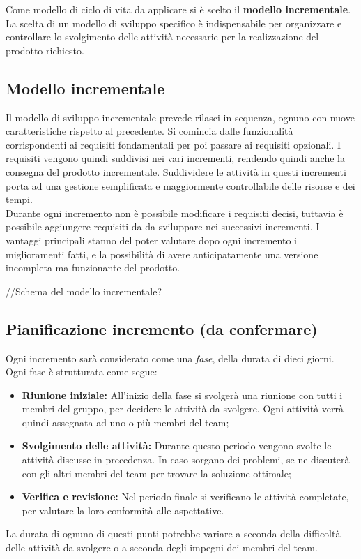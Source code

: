 Come modello di ciclo di vita da applicare si è scelto il \textbf{modello incrementale}. La scelta di un modello di sviluppo specifico è indispensabile per organizzare e controllare lo svolgimento delle attività necessarie per la realizzazione del prodotto richiesto.

\subsection{Modello incrementale}
Il modello di sviluppo incrementale prevede rilasci in sequenza, ognuno con nuove caratteristiche rispetto al precedente. Si comincia dalle funzionalità corrispondenti ai requisiti fondamentali per poi passare ai requisiti opzionali. I requisiti vengono quindi suddivisi nei vari incrementi, rendendo quindi anche la consegna del prodotto incrementale.
Suddividere le attività in questi incrementi porta ad una gestione semplificata e maggiormente controllabile delle risorse e dei tempi.\\
Durante ogni incremento non è possibile modificare i requisiti decisi, tuttavia è possibile aggiungere requisiti da da sviluppare nei successivi incrementi.
I vantaggi principali stanno del poter valutare dopo ogni incremento i miglioramenti fatti, e la possibilità di avere anticipatamente una versione incompleta ma funzionante del prodotto. \\
\begin{center}
//Schema del modello incrementale?
\end{center}
\subsection{Pianificazione incremento (da confermare)}
Ogni incremento sarà considerato come una \textit{fase}, della durata di dieci giorni. Ogni fase è strutturata come segue:
\begin{itemize}
\item \textbf{Riunione iniziale:} All'inizio della fase si svolgerà una riunione con tutti i membri del gruppo, per decidere le attività da svolgere. Ogni attività verrà quindi assegnata ad uno o più membri del team;
\item \textbf{Svolgimento delle attività:} Durante questo periodo vengono svolte le attività discusse in precedenza. In caso sorgano dei problemi, se ne discuterà con gli altri membri del team per trovare la soluzione ottimale;
\item \textbf{Verifica e revisione:} Nel periodo finale si verificano le attività completate, per valutare la loro conformità alle aspettative.
\end{itemize}
La durata di ognuno di questi punti potrebbe variare a seconda della difficoltà delle attività da svolgere o a seconda degli impegni dei membri del team.
\pagebreak